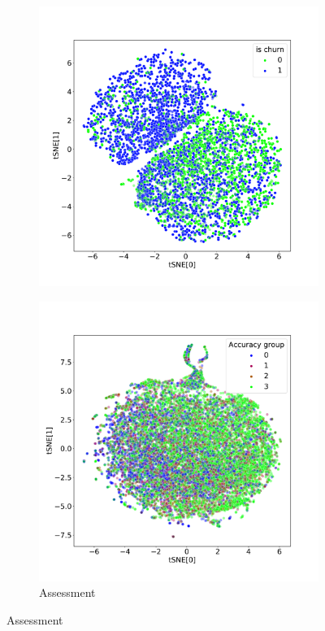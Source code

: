 \documentclass[sigconf]{acmart}
\begin{document}
\begin{figure}
\begin{subfigure}{0.5\textwidth}
    \includegraphics[width=\textwidth]{figures/iclr-churn-tsne.pdf}
    \label{fig-tsne-churn}
  \end{subfigure}
  \begin{subfigure}{0.5\textwidth}
    \caption{Assessment}
    \includegraphics[width=\textwidth]{figures/iclr-bowl-tsne-accuracy_group.pdf}

\end{subfigure}
\end{figure}
\end{document}
